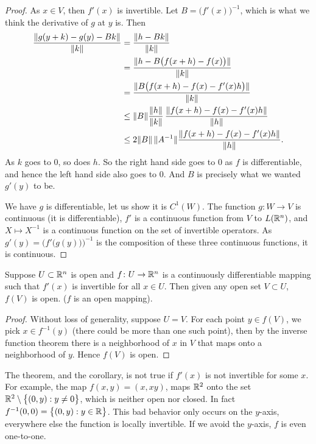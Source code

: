 \begin{proof}
As $x \in V$, then $f'(x)$ is invertible.
Let $B = \bigl(f'(x)\bigr)^{-1}$, which is what we think the derivative of
$g$ at $y$ is.  Then
\begin{equation*}
\begin{split}
\frac{\lVert {g(y+k)-g(y)-Bk} \rVert}{\lVert {k} \rVert}
& =
\frac{\lVert {h-Bk} \rVert}{\lVert {k} \rVert}
\\
& =
\frac{\lVert {h-B\bigl(f(x+h)-f(x)\bigr)} \rVert}{\lVert {k} \rVert}
\\
& =
\frac{\lVert {B\bigl(f(x+h)-f(x)-f'(x)h\bigr)} \rVert}{\lVert {k} \rVert}
\\
& \leq
\lVert {B} \rVert
\frac{\lVert {h} \rVert}{\lVert {k} \rVert}\,
\frac{\lVert {f(x+h)-f(x)-f'(x)h} \rVert}{\lVert {h} \rVert}
\\
& \leq
2\lVert {B} \rVert \, \lVert {A^{-1}} \rVert
\frac{\lVert {f(x+h)-f(x)-f'(x)h} \rVert}{\lVert {h} \rVert} .
\end{split}
\end{equation*}
As $k$ goes to 0, so does $h$.  So the right hand side goes to 0 as $f$ is
differentiable, and hence
the left hand side also goes to 0.  And
$B$ is precisely what we wanted $g'(y)$ to be.

We have $g$ is differentiable, let us show it is $C^1(W)$.
The function $g \colon W \to V$ is continuous (it is differentiable),
$f'$ is a continuous function from $V$
to $L({\mathbb{R}}^n)$, and $X \mapsto X^{-1}$ is a continuous function on
the set of invertible operators.
As
$g'(y) = {\bigl( f'\bigl(g(y)\bigr)\bigr)}^{-1}$ is the composition
of these three
continuous functions, it is continuous.
\end{proof}

\begin{cor}
Suppose $U \subset {\mathbb{R}}^n$ is open and $f \colon U \to {\mathbb{R}}^n$ is a continuously
differentiable mapping such that $f'(x)$ is invertible for all $x \in U$.  Then
given any open set $V \subset U$, $f(V)$ is open.  ($f$ is an open mapping).
\end{cor}

\begin{proof}
Without loss of generality, suppose $U=V$.
For each point $y \in f(V)$, we pick $x \in f^{-1}(y)$ (there could be more
than one such point), then by the inverse function theorem there is a
neighborhood of $x$ in $V$ that maps onto a neighborhood of $y$.  Hence
$f(V)$ is open.
\end{proof}

\begin{example}
The theorem, and the corollary, is not true if $f'(x)$ is not invertible for
some $x$.  For example,
the map $f(x,y) = (x,xy)$, maps ${\mathbb{R}}^2$ onto the set
${\mathbb{R}}^2 \setminus \bigl\{ (0,y) : y \neq 0 \bigr\}$, which is neither open nor closed.
In fact $f^{-1}(0,0) = \bigl\{ (0,y) : y \in {\mathbb{R}} \bigr\}$.  This bad behavior
only occurs on the $y$-axis, everywhere else the function is locally
invertible.  If we avoid the $y$-axis, $f$ is even one-to-one.
\end{example}

